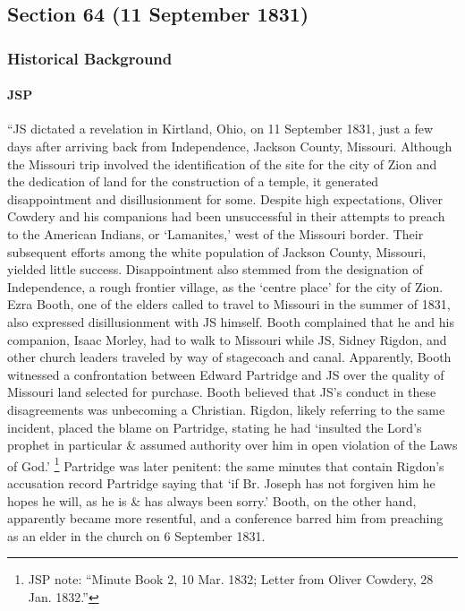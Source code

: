 \subsection{Section 64 (11 September 1831)}
	\label{DC64}
	
	\subsubsection{Historical Background}
		\label{DC64-HB}
		
		\paragraph{JSP}
		
			``JS dictated a revelation in Kirtland, Ohio, on 11 September 1831, just a few days after arriving back from Independence, Jackson County, Missouri. Although the Missouri trip involved the identification of the site for the city of Zion and the dedication of land for the construction of a temple, it generated disappointment and disillusionment for some. Despite high expectations, Oliver Cowdery and his companions had been unsuccessful in their attempts to preach to the American Indians, or `Lamanites,' west of the Missouri border. Their subsequent efforts among the white population of Jackson County, Missouri, yielded little success. Disappointment also stemmed from the designation of Independence, a rough frontier village, as the `centre place' for the city of Zion. Ezra Booth, one of the elders called to travel to Missouri in the summer of 1831, also expressed disillusionment with JS himself. Booth complained that he and his companion, Isaac Morley, had to walk to Missouri while JS, Sidney Rigdon, and other church leaders traveled by way of stagecoach and canal. Apparently, Booth witnessed a confrontation between Edward Partridge and JS over the quality of Missouri land selected for purchase. Booth believed that JS's conduct in these disagreements was unbecoming a Christian. Rigdon, likely referring to the same incident, placed the blame on Partridge, stating he had `insulted the Lord's prophet in particular \& assumed authority over him in open violation of the Laws of God.'%
				\footnote{%
					JSP note: ``Minute Book 2, 10 Mar. 1832; Letter from Oliver Cowdery, 28 Jan. 1832.''
					}
			Partridge was later penitent: the same minutes that contain Rigdon's accusation record Partridge saying that `if Br. Joseph has not forgiven him he hopes he will, as he is \& has always been sorry.' Booth, on the other hand, apparently became more resentful, and a conference barred him from preaching as an elder in the church on 6 September 1831.
			
